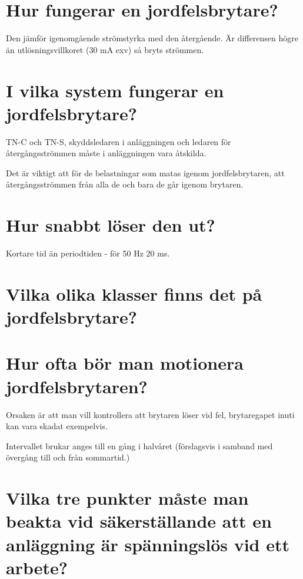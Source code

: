 \documentclass[a4paper,swedish]{article}
\begin{document}
\setcounter{section}{27}
\section{Hur fungerar en jordfelsbrytare?}\label{sec:RCD_working}

Den jämför igenomgående strömstyrka med den återgående. Är differensen högre än utlösningsvillkoret
(30 mA exv) så bryts strömmen.

\setcounter{section}{29}
\section{I vilka system fungerar en jordfelsbrytare?}\label{sec:RCD_systems}

TN-C och TN-S, skyddsledaren i anläggningen och ledaren för återgångsströmmen måste i anläggningen vara åtskilda.

Det är viktigt att för de belastningar som matas igenom jordfelsbrytaren, att återgångsströmmen från alla de och
bara de går igenom brytaren.

\setcounter{section}{31}
\section{Hur snabbt löser den ut?}\label{sec:RCD_how_fast}

Kortare tid än periodtiden - för 50 Hz  20 ms.

\setcounter{section}{33}
\section{Vilka olika klasser finns det på jordfelsbrytare?}\label{sec:RCD_klasser}

\setcounter{section}{35}
\section{Hur ofta bör man motionera jordfelsbrytaren?}\label{sec:motionering_RCD}

Orsaken är att man vill kontrollera att brytaren löser vid fel, brytaregapet inuti kan vara skadat exempelvis.

Intervallet brukar anges till en gång i halvåret (förslagsvis i samband med övergång till och från sommartid.)

\setcounter{section}{37}
\section{Vilka tre punkter måste man beakta vid säkerställande att en anläggning är
  spänningslös vid ett arbete?}
\end{document}
